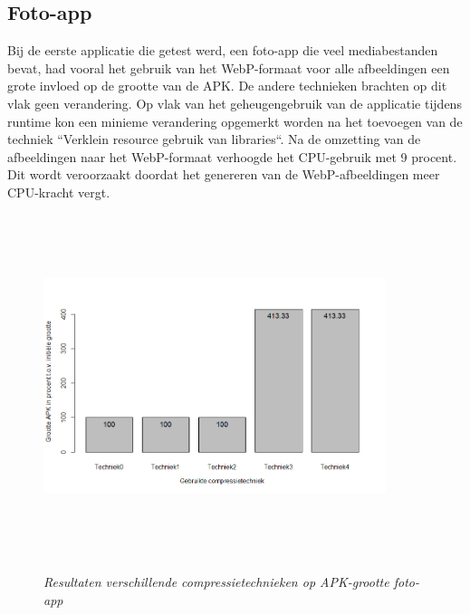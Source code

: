 \subsection{Foto-app}
Bij de eerste applicatie die getest werd, een foto-app die veel mediabestanden bevat, had vooral het gebruik van het WebP-formaat voor alle afbeeldingen een grote invloed op de grootte van de APK. De andere technieken brachten op dit vlak geen verandering. Op vlak van het geheugengebruik van de applicatie tijdens runtime kon een minieme verandering opgemerkt worden na het toevoegen van de techniek ``Verklein resource gebruik van libraries``. Na de omzetting van de afbeeldingen naar het WebP-formaat verhoogde het CPU-gebruik met 9 procent. Dit wordt veroorzaakt doordat het genereren van de WebP-afbeeldingen meer CPU-kracht vergt.
\begin{figure}[H]
	\centering
	\caption{\textit{Resultaten verschillende compressietechnieken op APK-grootte foto-app}}
	\includegraphics[width=10cm, height=10cm, keepaspectratio]{img/Rplot01}\\[.5cm]
	
\end{figure}

